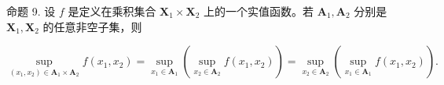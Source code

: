 命题 9. 设 \(f\) 是定义在乘积集合 \(\mathbf{X}_1 \times \mathbf{X}_2\) 上的一个实值函数。若 \(\mathbf{A}_1, \mathbf{A}_2\) 分别是 \(\mathbf{X}_1, \mathbf{X}_2\) 的任意非空子集，则

\[
\sup _ {(x _ {1}, x _ {2}) \in \mathbf {A} _ {1} \times \mathbf {A} _ {2}} f (x _ {1}, x _ {2}) = \sup _ {x _ {1} \in \mathbf {A} _ {1}} (\sup _ {x _ {2} \in \mathbf {A} _ {2}} f (x _ {1}, x _ {2})) = \sup _ {x _ {2} \in \mathbf {A} _ {2}} (\sup _ {x _ {1} \in \mathbf {A} _ {1}} f (x _ {1}, x _ {2})).\tag{8}
\]

